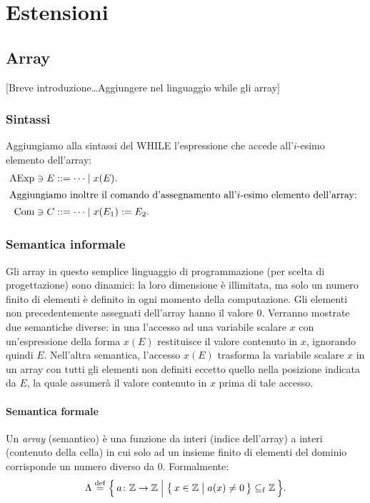 \chapter{Estensioni}

\section{Array} 

[Breve introduzione\dots Aggiungere nel linguaggio while gli array]

\subsection{Sintassi}

Aggiungiamo alla sintassi del WHILE l'espressione che accede
all'$i$-esimo elemento dell'array:
\begin{align*}
  \AExp \ni E &::= \dots \vbar x(E). \\
\intertext{%
Aggiungiamo inoltre il comando d'assegnamento all'$i$-esimo elemento
dell'array:
}
  \Com \ni C &::= \dots \vbar x(E_1) := E_2.
\end{align*}

\subsection{Semantica informale}

Gli array in questo semplice linguaggio di programmazione (per scelta
di progettazione) sono dinamici: la loro dimensione è illimitata,
ma solo un numero finito di elementi è definito in ogni momento
della computazione.
Gli elementi non precedentemente assegnati dell'array hanno il valore $0$.
Verranno mostrate due
semantiche diverse: in una l'accesso ad una
variabile scalare $x$ con un'espressione della forma $x(E)$
restituisce il valore contenuto in $x$, ignorando quindi $E$.
Nell'altra semantica, l'accesso $x(E)$ trasforma la
variabile scalare $x$ in un array con tutti gli elementi
non definiti eccetto quello nella posizione indicata da $E$,
la quale assumerà il valore contenuto in $x$ prima di tale accesso.

\subsubsection{Semantica formale}

\begin{definizione} 
Un \emph{array} (semantico) è una funzione da interi (indice
dell'array) a interi (contenuto della cella) in cui solo ad un insieme
finito di elementi del dominio corrisponde un numero diverso da $0$.
Formalmente:
\[
  \Lambda
    \defeq
      \Bigl\{\,
        \fund{a}{\Zset}{\Zset}
      \Bigm|
        \bigl\{\, x \in \Zset \bigm| a(x) \neq 0 \,\bigr\} \sseqf \Zset
      \,\Bigr\}.
\]
\end{definizione}

